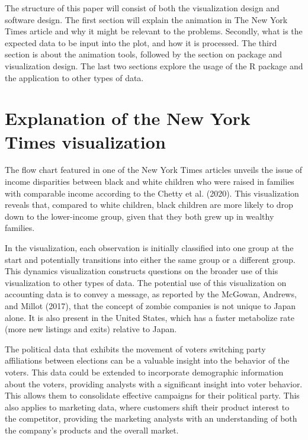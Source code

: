 The structure of this paper will consist of both the visualization design and software design. The first section will explain the animation in The New York Times article and why it might be relevant to the problems. Secondly, what is the expected data to be input into the plot, and how it is processed. The third section is about the animation tools, followed by the section on package and visualization design. The last two sections explore the usage of the R package and the application to other types of data.

\hypertarget{explanation-of-the-new-york-times-visualization}{%
\section{Explanation of the New York Times visualization}\label{explanation-of-the-new-york-times-visualization}}

The flow chart featured in one of the New York Times articles unveils the issue of income disparities between black and white children who were raised in families with comparable income according to the Chetty et al. (2020). This visualization reveals that, compared to white children, black children are more likely to drop down to the lower-income group, given that they both grew up in wealthy families.

In the visualization, each observation is initially classified into one group at the start and potentially transitions into either the same group or a different group. This dynamics visualization constructs questions on the broader use of this visualization to other types of data. The potential use of this visualization on accounting data is to convey a message, as reported by the McGowan, Andrews, and Millot (2017), that the concept of zombie companies is not unique to Japan alone. It is also present in the United States, which has a faster metabolize rate (more new listings and exits) relative to Japan.

The political data that exhibits the movement of voters switching party affiliations between elections can be a valuable insight into the behavior of the voters. This data could be extended to incorporate demographic information about the voters, providing analysts with a significant insight into voter behavior. This allows them to consolidate effective campaigns for their political party. This also applies to marketing data, where customers shift their product interest to the competitor, providing the marketing analysts with an understanding of both the company's products and the overall market.

